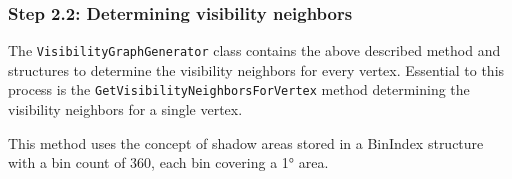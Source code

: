 		\subsubsection{Step 2.2: Determining visibility neighbors}
		
			The \texttt{VisibilityGraphGenerator} class contains the above described method and structures to determine the visibility neighbors for every vertex.
			Essential to this process is the \texttt{GetVisibilityNeighborsForVertex} method determining the visibility neighbors for a single vertex.
			
			This method uses the concept of shadow areas stored in a BinIndex structure with a bin count of 360, each bin covering a 1° area.
			
